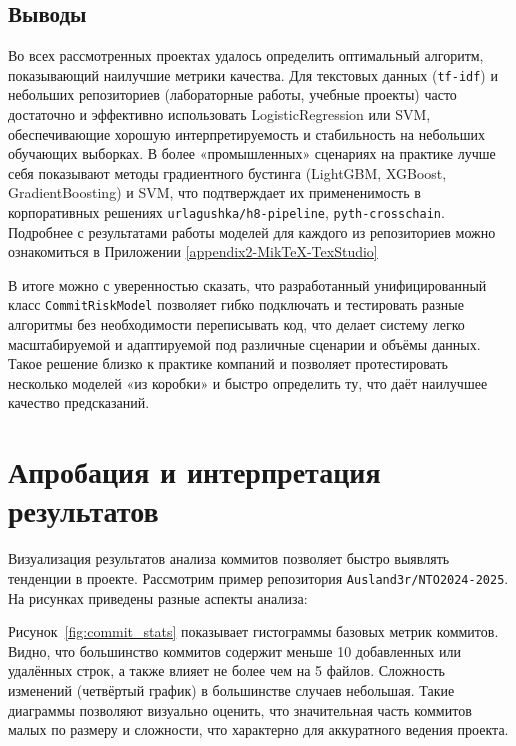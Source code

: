 \subsection{Выводы} 
Во всех рассмотренных проектах удалось определить оптимальный алгоритм, показывающий наилучшие метрики качества. Для текстовых данных (\texttt{tf-idf}) и небольших репозиториев (лабораторные работы, учебные проекты) часто достаточно и эффективно использовать LogisticRegression или SVM, обеспечивающие хорошую интерпретируемость и стабильность на небольших обучающих выборках. В более «промышленных» сценариях на практике лучше себя показывают методы градиентного бустинга (LightGBM, XGBoost, GradientBoosting) и SVM, что подтверждает их примененимость в корпоративных решениях \texttt{urlagushka/h8-pipeline}, \texttt{pyth-crosschain}. Подробнее с результатами работы моделей для каждого из репозиториев можно ознакомиться в Приложении \ref{appendix2-MikTeX-TexStudio}

В итоге можно с уверенностью сказать, что разработанный унифицированный класс \texttt{CommitRiskModel} позволяет гибко подключать и тестировать разные алгоритмы без необходимости переписывать код, что делает систему легко масштабируемой и адаптируемой под различные сценарии и объёмы данных. Такое решение близко к практике компаний и позволяет протестировать несколько моделей «из коробки» и быстро определить ту, что даёт наилучшее качество предсказаний.

\section{Апробация и интерпретация результатов}
Визуализация результатов анализа коммитов позволяет быстро выявлять тенденции в проекте. Рассмотрим пример репозитория \texttt{Ausland3r/NTO2024-2025}. На рисунках приведены разные аспекты анализа:

Рисунок~\ref{fig:commit_stats} показывает гистограммы базовых метрик коммитов. Видно, что большинство коммитов содержит меньше 10 добавленных или удалённых строк, а также влияет не более чем на 5 файлов. Сложность изменений (четвёртый график) в большинстве случаев небольшая. Такие диаграммы позволяют визуально оценить, что значительная часть коммитов малых по размеру и сложности, что характерно для аккуратного ведения проекта. 


